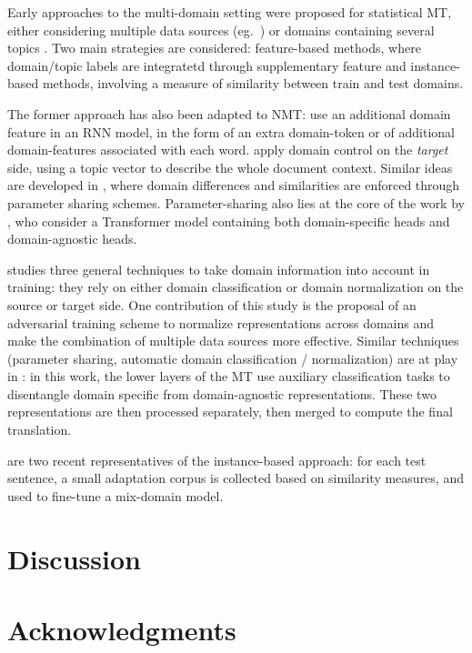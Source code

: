 \documentclass[11pt,a4paper]{article}
\newcommand{\mpTodo}[1]{\Todo[MP:]{\textcolor{green}{#1}}}
\begin{document}
Early approaches to the multi-domain setting were proposed for statistical MT, either considering multiple data sources (eg.\ \cite{Banerjee10combining,Clark12onesystem,Sennrich13multidomain,Huck15mixeddomain}) or domains containing several topics \cite{Eidelman12topic,Hasler14dynamic-topic}. Two main strategies are considered: feature-based methods, where domain/topic labels are integratetd through supplementary feature and instance-based methods, involving a measure of similarity between train and test domains. 

The former approach has also been adapted to NMT:  use an additional domain feature in an RNN model, in the form of an extra domain-token or of additional domain-features associated with each word. \citet{Chen16guided} apply domain control on the \emph{target} side, using a topic vector to describe the whole document context. Similar ideas are developed in \cite{Chu18multilingual,Pham19generic}, where domain differences and similarities are enforced through parameter sharing schemes. Parameter-sharing also lies at the core of the work by \citet{Jiang19multidomain}, who consider a Transformer model containing both domain-specific heads and domain-agnostic heads.

\citet{Britz17mixing} studies three general techniques to take domain information into account in training: they rely on either domain classification or domain normalization on the source or target side. One contribution of this study is the proposal of an adversarial training scheme to normalize representations across domains and make the combination of multiple data sources more effective. Similar techniques (parameter sharing, automatic domain classification / normalization) are at play in \cite{Zeng18multidomain}: in this work, the lower layers of the MT use auxiliary classification tasks to disentangle domain specific from domain-agnostic representations. These two representations are then processed separately, then merged to compute the final translation.

\citet{Farajian17multidomain,li-etal-2018-one} are two recent representatives of the instance-based approach: for each test sentence, a small adaptation corpus is collected based on similarity measures, and used to fine-tune a mix-domain model.

\section{Discussion \label{sec:discussion}}
\mpTodo{discussion}

\section*{Acknowledgments}



\end{document}
